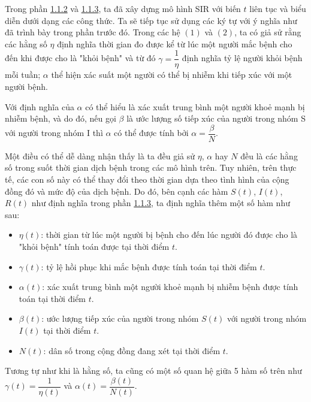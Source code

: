 \documentclass[a4paper]{article}
\begin{document}
Trong phần \hyperref[sec: discrete SIR]{1.1.2} và \hyperref[sec: continuous SIR]{1.1.3}, ta đã xây dựng mô hình SIR với biến $t$ liên tục và biểu diễn dưới dạng các công thức. Ta sẽ tiếp tục sử dụng các ký tự với ý nghĩa như đã trình bày trong phần trước đó. Trong các hệ \hyperref[equations: 1]{$(1)$} và \hyperref[equations: 2]{$(2)$}, ta có giả sử rằng các hằng số $\eta$ định nghĩa thời gian đo được kể từ lúc một người mắc bệnh cho đến khi được cho là "khỏi bệnh" và từ đó $\gamma = \dfrac{1}{\eta}$ định nghĩa tỷ lệ người khỏi bệnh mỗi tuần; $\alpha$ thể hiện xác suất một người có thể bị nhiễm khi 
tiếp xúc với một người bệnh. 

Với định nghĩa của $\alpha$ có thể hiểu là xác xuất trung bình một người khoẻ mạnh bị nhiễm bệnh, và do đó, nếu gọi $\beta$ là ước lượng số tiếp xúc của người trong nhóm S với người trong nhóm I thì $\alpha$ có thể được tính bởi $\alpha = \dfrac{\beta}{N}$.

Một điều có thể dễ dàng nhận thấy là ta đều giả sử $\eta$, $\alpha$ hay $N$ đều là các hằng số trong suốt thời gian dịch bệnh trong các mô hình trên. Tuy nhiên, trên thực tế, các con số này có thể thay đổi theo thời gian dựa theo tình hình của cộng đồng đó và mức độ của dịch bệnh. Do đó, bên cạnh các hàm $S(t)$, $I(t)$, $R(t)$ như định nghĩa trong phần \hyperref[sec: continuous SIR]{1.1.3}, ta định nghĩa thêm một số hàm như sau:
\begin{itemize}
    \item $\eta(t)$: thời gian từ lúc một người bị bệnh cho đến lúc người đó được cho là "khỏi bệnh" tính toán được tại thời điểm $t$.
    \item $\gamma(t)$: tỷ lệ hồi phục khi mắc bệnh được tính toán tại thời điểm $t$.
    \item $\alpha(t)$: xác xuất trung bình một người khoẻ mạnh bị nhiễm bệnh được tính toán tại thời điểm $t$.
    \item $\beta(t)$: ước lượng tiếp xúc của người trong nhóm $S(t)$ với người trong nhóm $I(t)$ tại thời điểm $t$.
    \item $N(t)$: dân số trong cộng đồng đang xét tại thời điểm $t$.
\end{itemize}

Tương tự như khi là hằng số, ta cũng có một số quan hệ giữa 5 hàm số trên như $\gamma(t)=\dfrac{1}{\eta(t)}$ và $\alpha(t)=\dfrac{\beta(t)}{N(t)}$. 
\end{document}
